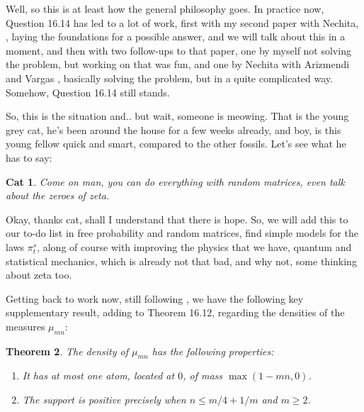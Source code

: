 \documentclass[12pt]{amsbook}
\newtheorem{theorem}{Theorem}[chapter]
\newtheorem{cat}[theorem]{Cat}
\begin{document}
Well, so this is at least how the general philosophy goes. In practice now, Question 16.14 has led to a lot of work, first with my second paper with Nechita, \cite{bn2}, laying the foundations for a possible answer, and we will talk about this in a moment, and then with two follow-ups to that \cite{bn2} paper, one by myself not solving the problem, but working on that was fun, and one by Nechita with Arizmendi and Vargas \cite{anv}, basically solving the problem, but in a quite complicated way. Somehow, Question 16.14 still stands.

\bigskip

So, this is the situation and.. but wait, someone is meowing. That is the young grey cat, he's been around the house for a few weeks already, and boy, is this young fellow quick and smart, compared to the other fossils. Let's see what he has to say:

\begin{cat}
Come on man, you can do everything with random matrices, even talk about the zeroes of zeta. 
\end{cat}

Okay, thanks cat, shall I understand that there is hope. So, we will add this to our to-do list in free probability and random matrices, find simple models for the laws $\pi^s_t$, along of course with improving the physics that we have, quantum and statistical mechanics, which is  already not that bad, and why not, some thinking about zeta too.

\bigskip

Getting back to work now, still following \cite{bn1}, we have the following key supplementary result, adding to Theorem 16.12, regarding the densities of the measures $\mu_{mn}$:

\begin{theorem}
The density of $\mu_{mn}$ has the following properties:
\begin{enumerate}
\item It has at most one atom, located at $0$, of mass $\max(1-mn,0)$.

\item The support is positive precisely when $n\leq m/4+1/m$ and $m \geq 2$.
\end{enumerate}
\end{theorem}
\end{document}
